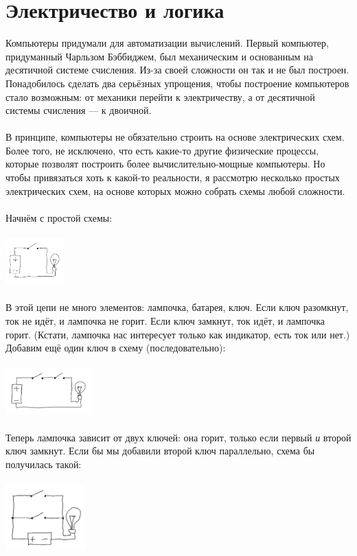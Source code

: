 \documentclass[11pt]{book}
\begin{document}
\section{Электричество и логика}
Компьютеры придумали для автоматизации вычислений.
Первый компьютер, придуманный Чарльзом Бэббиджем, был механическим и основанным на десятичной системе счисления.
Из-за своей сложности он так и не был построен.
Понадобилось сделать два серьёзных упрощения, чтобы построение компьютеров стало возможным:
от механики перейти к электричеству, а от десятичной системы счисления --- к двоичной.
\\ \\
В принципе, компьютеры не обязательно строить на основе электрических схем.
Более того, не исключено, что есть какие-то другие физические процессы,
которые позволят построить более вычислительно-мощные компьютеры.
Но чтобы привязаться хоть к какой-то реальности, я рассмотрю несколько простых электрических схем,
на основе которых можно собрать схемы любой сложности.
\\ \\
Начнём с простой схемы:
\\ \\
\includegraphics[height=0.7in]{pic/2.png}
\\ \\
В этой цепи не много элементов: лампочка, батарея, ключ. Если ключ разомкнут,
ток не идёт, и лампочка не горит. Если ключ замкнут, ток идёт, и лампочка горит.
(Кстати, лампочка нас интересует только как индикатор, есть ток или нет.)
Добавим ещё один ключ в схему (последовательно):
\\ \\
\includegraphics[height=0.7in]{pic/4.png}
\\ \\
Теперь лампочка зависит от двух ключей: она горит, только если первый \emph{и} второй ключ замкнут.
Если бы мы добавили второй ключ параллельно, схема бы получилась такой:
\\ \\
\includegraphics[height=1in]{pic/6.png}
\end{document}
